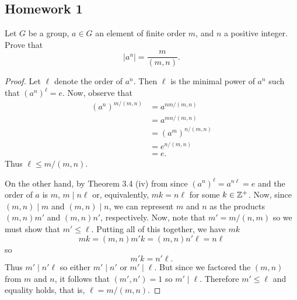 \newpage

\subsection{Homework 1}
\begin{problem}
  Let $G$ be a group, $a\in G$ an element of finite order $m$, and $n$ a
  positive integer. Prove that
  \[
    |a^n|=\frac{m}{(m,n)}.
  \]
\end{problem}
\begin{proof}
  Let $\ell$ denote the order of $a^n$. Then $\ell$ is the minimal power of
  $a^n$ such that ${(a^n)}^\ell=e$. Now, observe that
  \begin{equation}
    \label{eq:1:1}
    \begin{aligned}
      {(a^n)}^{m/(m,n)}
      &=a^{nm/(m,n)}\\
      &=a^{mn/(m,n)}\\
      &={(a^m)}^{n/(m,n)}\\
      &=e^{n/(m,n)}\\
      &=e.
    \end{aligned}
  \end{equation}
  Thus $\ell\leq m/(m,n)$.

  On the other hand, by Theorem 3.4 (iv) from \cite[Ch.\@ I \S 3.3, p.\@
  35]{hungerford} since ${(a^n)}^\ell=a^{n\ell}=e$ and the order of $a$ is
  $m$, $m\mid n\ell$ or, equivalently, $mk=n\ell$ for some
  $k\in\mathbb{Z}^+$. Now, since $(m,n)\mid m$ and $(m,n)\mid n$, we can
  represent $m$ and $n$ as the products $(m,n)m'$ and $(m,n)n'$,
  respectively. Now, note that $m'=m/(n,m)$ so we must show that
  $m'\leq\ell$. Putting all of this together, we have $mk$
  \begin{equation}
    \label{eq:1:2}
    mk=(m,n)m'k=(m,n)n'\ell=n\ell
  \end{equation}
  so
  \begin{equation}
    \label{eq:1:3}
    m'k=n'\ell.
  \end{equation}
  Thus $m'\mid n'\ell$ so either $m'\mid n'$ or $m'\mid\ell$. But since we
  factored the $(m,n)$ from $m$ and $n$, it follows that $(m',n')=1$ so
  $m'\mid \ell$. Therefore $m'\leq\ell$ and equality holds, that is,
  $\ell=m/(m,n)$.
\end{proof}

